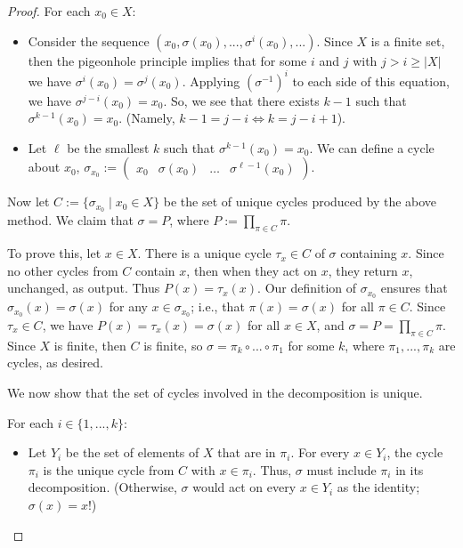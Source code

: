 \begin{proof}
    For each $x_0 \in X$:

    \begin{itemize}
        \item Consider the sequence $(x_0, \sigma(x_0), ..., \sigma^i(x_0), ...)$. Since $X$ is a finite set, then the pigeonhole principle implies that for some $i$ and $j$ with $j > i \geq |X|$ we have $\sigma^i(x_0) = \sigma^j(x_0)$. Applying $(\sigma^{-1})^i$ to each side of this equation, we have $\sigma^{j - i}(x_0) = x_0$. So, we see that there exists $k - 1$ such that $\sigma^{k - 1}(x_0) = x_0$. (Namely, $k - 1 = j - i \iff k = j - i + 1$).
        \item Let $\ell$ be the smallest $k$ such that $\sigma^{k - 1}(x_0) = x_0$. We can define a cycle about $x_0$, $\sigma_{x_0} := \begin{pmatrix} x_0 & \sigma(x_0) & \hdots & \sigma^{\ell - 1}(x_0) \end{pmatrix}$.
    \end{itemize}

    Now let $C := \{ \sigma_{x_0} \mid x_0 \in X \}$ be the set of unique cycles produced by the above method. We claim that $\sigma = P$, where $P := \prod_{\pi \in C} \pi$.
    
    To prove this, let $x \in X$. There is a unique cycle $\tau_x \in C$ of $\sigma$ containing $x$. Since no other cycles from $C$ contain $x$, then when they act on $x$, they return $x$, unchanged, as output. Thus $P(x) = \tau_x(x)$. Our definition of $\sigma_{x_0}$ ensures that $\sigma_{x_0}(x) = \sigma(x)$ for any $x \in \sigma_{x_0}$; i.e., that $\pi(x) = \sigma(x)$ for all $\pi \in C$. Since $\tau_x \in C$, we have $P(x) = \tau_x(x) = \sigma(x)$ for all $x \in X$, and $\sigma = P = \prod_{\pi \in C} \pi$. Since $X$ is finite, then $C$ is finite, so $\sigma = \pi_k \circ ... \circ \pi_1$ for some $k$, where $\pi_1, ..., \pi_k$ are cycles, as desired.

    \vspace{.5cm}

    \newcommand{\tpi}{\widetilde{\pi}}

    We now show that the set of cycles involved in the decomposition is unique. 
    
    For each $i \in \{1, ..., k\}$:
    
    \begin{itemize}
        \item Let $Y_i$ be the set of elements of $X$ that are in $\pi_i$. For every $x \in Y_i$, the cycle $\pi_i$ is the unique cycle from $C$ with $x \in \pi_i$. Thus, $\sigma$ must include $\pi_i$ in its decomposition. (Otherwise, $\sigma$ would act on every $x \in Y_i$ as the identity; $\sigma(x) = x$!) 
    \end{itemize}
    

\end{proof}
